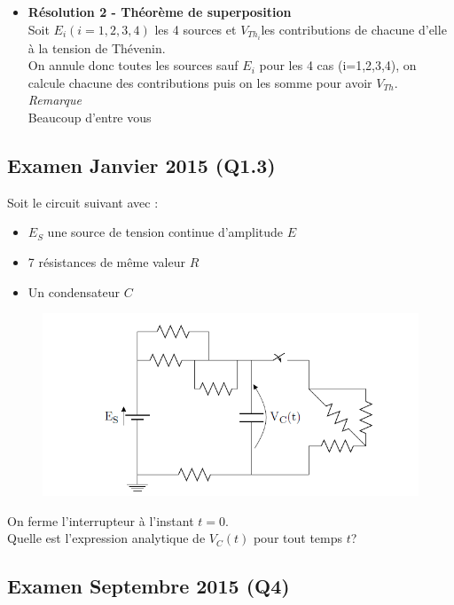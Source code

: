 \begin{itemize}
{\begin{itemize}
\begin{equation*}
        \end{equation*}
        Et donc finalement : $V_{Th}=E-r*i_1 = \dfrac{5}{2}*E$
        \item \textbf{Résolution 2 - Théorème de superposition}\\
        Soit $E_i(i = 1,2,3,4)$ les 4 sources et $V_{Th_i}$les contributions de chacune d'elle à la tension de Thévenin.\\
        On annule donc toutes les sources sauf $E_i$ pour les 4 cas (i=1,2,3,4), on calcule chacune des contributions puis on les somme pour avoir $V_{Th}$.\\
        \textit{Remarque}\\
        Beaucoup d'entre vous 
    \end{itemize}
    }
\end{itemize}

\newpage
\subsection{Examen Janvier 2015 (Q1.3)}
Soit le circuit suivant avec :
\begin{itemize}
    \item $E_S$ une source de tension continue d'amplitude $E$
    \item 7 résistances de même valeur $R$
    \item Un condensateur $C$
\end{itemize}
\begin{figure}[h!]
    \centering
    \includegraphics[width = 14cm]{TpQEx_Circuits/Q1_3_Janv_2015.PNG}
    \label{fig:Q1_3_TheoCircuits_Janv2015}
\end{figure}
On ferme l'interrupteur à l'instant $t=0$.\\
Quelle est l'expression analytique de $V_C(t)$ pour tout temps $t$?


\newpage
\subsection{Examen Septembre 2015 (Q4)}

